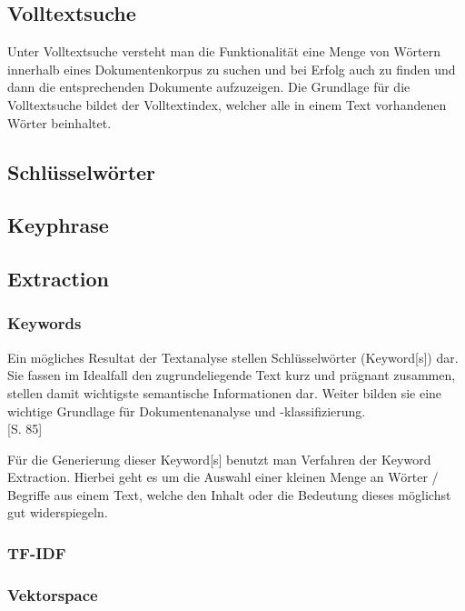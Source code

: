 
\subsection{\gls{Volltextsuche}}
Unter \gls{Volltextsuche} versteht man die Funktionalität eine Menge von Wörtern innerhalb eines Dokumentenkorpus zu suchen und bei Erfolg auch zu finden und dann die entsprechenden Dokumente aufzuzeigen. Die Grundlage für die \gls{Volltextsuche} bildet der Volltextindex, welcher alle in einem Text vorhandenen Wörter beinhaltet.

\subsection{Schlüsselwörter}
\subsection{Keyphrase}

\subsection{\gls{Extraction}}\label{keyword-extraction}

\subsubsection{Keywords}

Ein mögliches Resultat der \gls{Textanalyse} stellen Schlüsselwörter (\gls{Keyword}[s]) dar. Sie fassen im Idealfall den zugrundeliegende Text kurz und prägnant zusammen, stellen damit wichtigste semantische Informationen dar. Weiter bilden sie eine wichtige Grundlage für Dokumentenanalyse und -klassifizierung. 
\\\cite{Zhang2006}[S. 85]


Für die Generierung dieser \gls{Keyword}[s] benutzt man Verfahren der \gls{Keyword Extraction}. Hierbei geht es um die Auswahl einer kleinen Menge an Wörter / Begriffe aus einem Text, welche den Inhalt oder die Bedeutung dieses möglichst gut widerspiegeln.
\\\cite{hulth2004}

\subsubsection{TF-IDF}

\subsubsection{Vektorspace}

